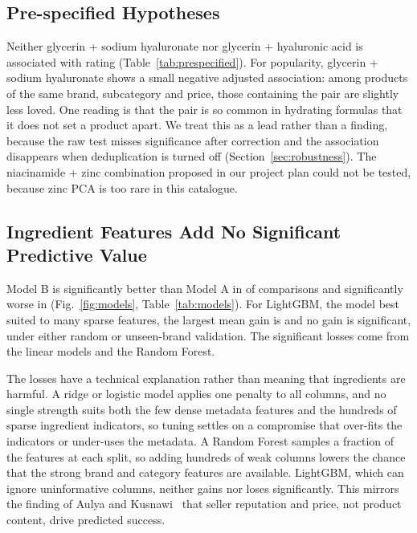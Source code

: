 \documentclass[11pt,a4paper]{article}
\newcommand{\draft}[1]{{\color{blue!70!black}#1}}
\begin{document}


\subsection{Pre-specified Hypotheses}
Neither glycerin + sodium hyaluronate nor glycerin + hyaluronic acid is associated with rating (Table~\ref{tab:prespecified}). \draft{For popularity, glycerin + sodium hyaluronate shows a small negative adjusted association: among products of the same brand, subcategory and price, those containing the pair are slightly less loved. One reading is that the pair is so common in hydrating formulas that it does not set a product apart. We treat this as a lead rather than a finding, because the raw test misses significance after correction and the association disappears when deduplication is turned off (Section~\ref{sec:robustness}).} The niacinamide + zinc combination proposed in our project plan could not be tested, because zinc PCA is too rare in this catalogue.



\subsection{Ingredient Features Add No Significant Predictive Value}
Model B is significantly better than Model A in \NBBetter{} of \NComparisons{} comparisons and significantly worse in \NABetter{} (Fig.~\ref{fig:models}, Table~\ref{tab:models}). For LightGBM, the model best suited to many sparse features, the largest mean gain is \MaxLGBMGain{} and no gain is significant, under either random or unseen-brand validation. The significant losses come from the linear models and the Random Forest.

\draft{The losses have a technical explanation rather than meaning that ingredients are harmful. A ridge or logistic model applies one penalty to all columns, and no single strength suits both the few dense metadata features and the hundreds of sparse ingredient indicators, so tuning settles on a compromise that over-fits the indicators or under-uses the metadata. A Random Forest samples a fraction of the features at each split, so adding hundreds of weak columns lowers the chance that the strong brand and category features are available. LightGBM, which can ignore uninformative columns, neither gains nor loses significantly. This mirrors the finding of Aulya and Kusnawi~\cite{aulya2025} that seller reputation and price, not product content, drive predicted success.}
\end{document}
